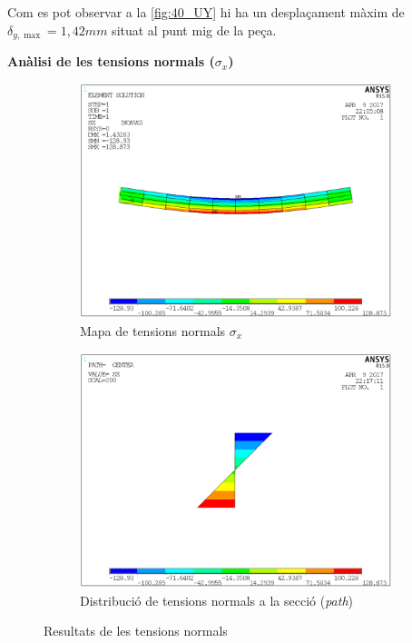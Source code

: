 \documentclass[a4paper]{article}
\def\imgS{0.42\textwidth}
\begin{document}
Com es pot observar a la \autoref{fig:40_UY} hi ha un desplaçament màxim de $\delta_{y, \max} = 1,42 mm$ situat al punt mig de la peça.

\textbf{Anàlisi de les tensions normals ($\sigma_x$)}
\begin{figure}[H]
	\begin{subfigure}{\imgS}
		\includegraphics[width=\textwidth]{images/40_stress}
		\caption{Mapa de tensions normals {$\sigma_x$}}
		\label{fig:40_stress}
	\end{subfigure}
	\hfill
	\begin{subfigure}{\imgS}
		\includegraphics[width=\textwidth]{images/40_stress_path}
		\caption{Distribució de tensions normals a la secció (\emph{path})}
		\label{fig:40_stress_path}
	\end{subfigure}
	\caption{Resultats de les tensions normals}
	\label{fig:40_stress_results}
\end{figure}
\end{document}
